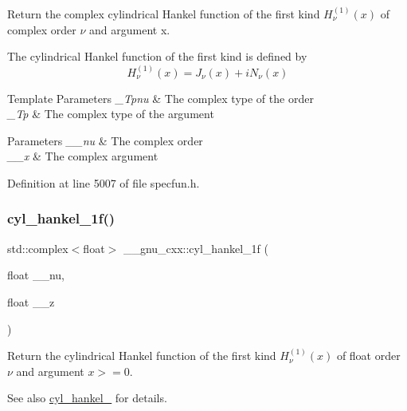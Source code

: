 Return the complex cylindrical Hankel function of the first kind $ H^{(1)}_\nu(x) $ of complex order $ \nu $ and argument {\ttfamily x}.

The cylindrical Hankel function of the first kind is defined by \[ H^{(1)}_\nu(x) = J_\nu(x) + i N_\nu(x) \]


\begin{DoxyTemplParams}{Template Parameters}
{\em \+\_\+\+Tpnu} & The complex type of the order \\
\hline
{\em \+\_\+\+Tp} & The complex type of the argument \\
\hline
\end{DoxyTemplParams}

\begin{DoxyParams}{Parameters}
{\em \+\_\+\+\_\+nu} & The complex order \\
\hline
{\em \+\_\+\+\_\+x} & The complex argument \\
\hline
\end{DoxyParams}


Definition at line 5007 of file specfun.\+h.

\mbox{\label{group__mathsf__gnu_ga89758ed03e56567baa62b90cc4784f71}} 
\subsubsection{\texorpdfstring{cyl\+\_\+hankel\+\_\+1f()}{cyl\_hankel\_1f()}\hspace{0.1cm}{\footnotesize\ttfamily [1/2]}}
{\footnotesize\ttfamily std\+::complex$<$float$>$ \+\_\+\+\_\+gnu\+\_\+cxx\+::cyl\+\_\+hankel\+\_\+1f (\begin{DoxyParamCaption}\item[{float}]{\+\_\+\+\_\+nu,  }\item[{float}]{\+\_\+\+\_\+z }\end{DoxyParamCaption})\hspace{0.3cm}{\ttfamily [inline]}}

Return the cylindrical Hankel function of the first kind $ H^{(1)}_\nu(x) $ of {\ttfamily float} order $ \nu $ and argument $ x >= 0 $.

\begin{DoxySeeAlso}{See also}
\hyperlink{group__mathsf__gnu_ga5329bba77d10a9d2f15d9bbe43a70db3}{cyl\+\_\+hankel\+\_} for details. 
\end{DoxySeeAlso}


